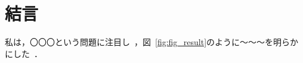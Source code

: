 \documentclass[11pt,dvipdfmx,svgnames,a4paper,uplatex]{ujarticle}
\begin{document}
\textcolor{LightGray}{
}


\section{結言}

私は，〇〇〇という問題に注目し~\cite{Goto2017a,GotoJPS2018}，図~\ref{fig:fig_result}のように〜〜〜を明らかにした~\cite{Araki_master_thesis}．

\printbibliography[title=\reftitle]
\end{document}
